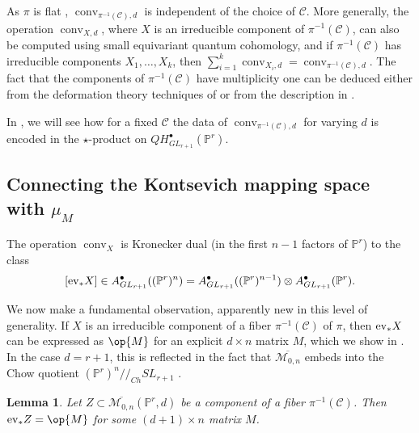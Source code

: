 \documentclass[12pt]{amsart}
\newcommand{\mb}{\mathbb}
\newcommand{\mc}{\mathcal}
\newcommand{\ol}{\overline}
\newcommand{\ev}{{\rm ev}}
\newcommand{\MM}{{\mathcal M}}
\newcommand{\conv}{{\operatorname{conv}}}
\theoremstyle{plain}
\newtheorem{Lem}[Thm]{Lemma}
\theoremstyle{definition}
\theoremstyle{remark}
\begin{document}
As $\pi$ is flat \cite[Remark 2.6.8]{Kock}, $\conv_{\pi^{-1}(\mathcal{C}),d}$ is independent of the choice of $\mathcal{C}$. More generally, the operation $\conv_{X,d}$, where $X$ is an irreducible component of $\pi^{-1}(\mc{C})$, can also be computed using small equivariant quantum cohomology, and if $\pi^{-1}(\mc{C})$ has irreducible components $X_1, \ldots, X_k$, then $\sum_{i=1}^k \conv_{X_i, d}=\conv_{\pi^{-1}(\mc{C}), d}$. The fact that the components of $\pi^{-1}(\mc{C})$ have multiplicity one can be deduced either from the deformation theory techniques of \cite[Section 5]{FP} or from the description in \cite[Section 4.1]{Conformal}. 

In , we will see how for a fixed $\mathcal{C}$ the data of $\conv_{\pi^{-1}(\mc{C}),d}$ for varying $d$ is encoded in the $\star$-product on $QH^\bullet_{GL_{r+1}}(\mb{P}^r)$.

\subsection{Connecting the Kontsevich mapping space with $\mu_M$}
The operation $\conv_X$ is Kronecker dual (in the first $n-1$ factors of $\mb{P}^r$) to the class  \[[\ev_*X] \in A^\bullet_{GL_{r+1}}((\mb{P}^r)^{n}) = A^\bullet_{GL_{r+1}}((\mb{P}^r)^{n-1}) \otimes A^\bullet_{GL_{r+1}}(\mb{P}^r).\]

We now make a fundamental observation, apparently new in this level of generality. If $X$ is an irreducible component of a fiber $\pi^{-1}(\mc{C})$ of $\pi$, then $\ev_*X$ can be expressed as $\op{M}$ for an explicit $d \times n$ matrix $M$, which we show in .
In the case $d=r+1$, this is reflected in the fact that $\ol{\MM_{0,n}}$ embeds into the Chow quotient $(\mb{P}^r)^n//_{Ch}SL_{r+1}$ \cite[Section 3.2]{Conformal}.

\begin{Lem}
\label{KGO}
Let $Z\subset \ol{\MM_{0,n}}(\mb{P}^r,d)$ be a component of a fiber $\pi^{-1}(\mathcal{C})$. Then $\ev_*Z=\op{M}$ for some $(d+1)\times n$ matrix $M$.
\end{Lem}
\end{document}
